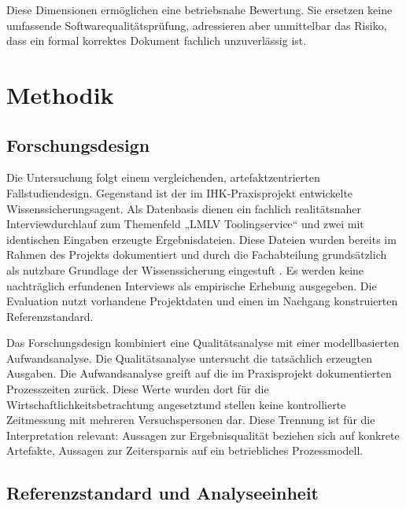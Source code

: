 \documentclass[
  10pt,
  ngerman,
  a4paper,
  toc=graduated,
  numbers=noenddot,
  headings=standardclasses,
  nonumberlist
]{scrartcl}
\begin{document}
Diese Dimensionen ermöglichen eine betriebsnahe Bewertung. Sie ersetzen keine umfassende Softwarequalitätsprüfung, adressieren aber unmittelbar das Risiko, dass ein formal korrektes Dokument fachlich unzuverlässig ist.

\section{Methodik}

\subsection{Forschungsdesign}

Die Untersuchung folgt einem vergleichenden, artefaktzentrierten Fallstudiendesign. Gegenstand ist der im IHK-Praxisprojekt entwickelte Wissenssicherungsagent. Als Datenbasis dienen ein fachlich realitätsnaher Interviewdurchlauf zum Themenfeld „LMLV Toolingservice“ und zwei mit identischen Eingaben erzeugte Ergebnisdateien. Diese Dateien wurden bereits im Rahmen des Projekts dokumentiert und durch die Fachabteilung grundsätzlich als nutzbare Grundlage der Wissenssicherung eingestuft \cite{sommer2026projekt}. Es werden keine nachträglich erfundenen Interviews als empirische Erhebung ausgegeben. Die Evaluation nutzt vorhandene Projektdaten und einen im Nachgang konstruierten Referenzstandard.

Das Forschungsdesign kombiniert eine Qualitätsanalyse mit einer modellbasierten Aufwandsanalyse. Die Qualitätsanalyse untersucht die tatsächlich erzeugten Ausgaben. Die Aufwandsanalyse greift auf die im Praxisprojekt dokumentierten Prozesszeiten zurück. Diese Werte wurden dort für die Wirtschaftlichkeitsbetrachtung angesetztund stellen keine kontrollierte Zeitmessung mit mehreren Versuchspersonen dar. Diese Trennung ist für die Interpretation relevant: Aussagen zur Ergebnisqualität beziehen sich auf konkrete Artefakte, Aussagen zur Zeitersparnis auf ein betriebliches Prozessmodell.

\subsection{Referenzstandard und Analyseeinheit}
\end{document}
